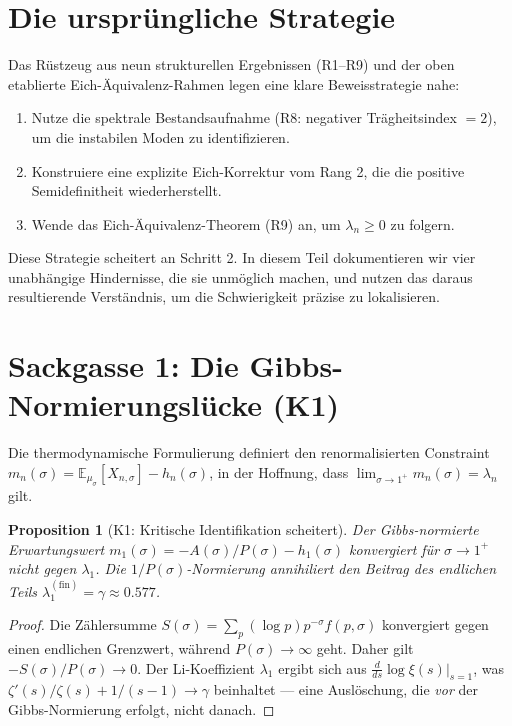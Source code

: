 \documentclass[12pt,a4paper]{article}
\newtheorem{proposition}[theorem]{Proposition}
\theoremstyle{definition}
\theoremstyle{remark}
\newcommand{\EE}{\mathbb{E}}
\newcommand{\muG}{\mu_\sigma}
\begin{document}
\section{Die ursprüngliche Strategie}
\label{sec:original-strategy}

Das Rüstzeug aus neun strukturellen Ergebnissen (R1--R9) und der oben etablierte Eich-Äquivalenz-Rahmen legen eine klare Beweisstrategie nahe:

\begin{enumerate}
  \item Nutze die spektrale Bestandsaufnahme (R8: negativer Trägheitsindex $= 2$), um die instabilen Moden zu identifizieren.
  \item Konstruiere eine explizite Eich-Korrektur vom Rang 2, die die positive Semidefinitheit wiederherstellt.
  \item Wende das Eich-Äquivalenz-Theorem (R9) an, um $\lambda_n \geq 0$ zu folgern.
\end{enumerate}

Diese Strategie scheitert an Schritt 2. In diesem Teil dokumentieren wir vier unabhängige Hindernisse, die sie unmöglich machen, und nutzen das daraus resultierende Verständnis, um die Schwierigkeit präzise zu lokalisieren.


\section{Sackgasse 1: Die Gibbs-Normierungslücke (K1)}
\label{sec:K1}

Die thermodynamische Formulierung definiert den renormalisierten Constraint $m_n(\sigma) = \EE_{\muG}[X_{n,\sigma}] - h_n(\sigma)$, in der Hoffnung, dass $\lim_{\sigma \to 1^+} m_n(\sigma) = \lambda_n$ gilt.

\begin{proposition}[K1: Kritische Identifikation scheitert]
\label{prop:K1}
Der Gibbs-normierte Erwartungswert $m_1(\sigma) = -A(\sigma)/P(\sigma) - h_1(\sigma)$ konvergiert für $\sigma \to 1^+$ \emph{nicht} gegen $\lambda_1$. Die $1/P(\sigma)$-Normierung annihiliert den Beitrag des endlichen Teils $\lambda_1^{(\mathrm{fin})} = \gamma \approx 0.577$.
\end{proposition}

\begin{proof}
Die Zählersumme $S(\sigma) = \sum_p (\log p)p^{-\sigma}f(p,\sigma)$ konvergiert gegen einen endlichen Grenzwert, während $P(\sigma) \to \infty$ geht. Daher gilt $-S(\sigma)/P(\sigma) \to 0$. Der Li-Koeffizient $\lambda_1$ ergibt sich aus $\frac{d}{ds}\log\xi(s)|_{s=1}$, was $\zeta'(s)/\zeta(s) + 1/(s-1) \to \gamma$ beinhaltet --- eine Auslöschung, die \emph{vor} der Gibbs-Normierung erfolgt, nicht danach.
\end{proof}
\end{document}
